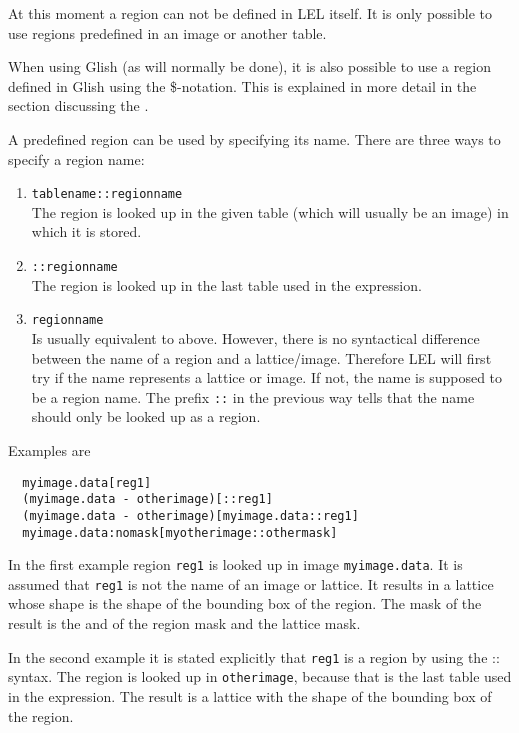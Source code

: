 \medskip\noindent At this moment a region can not be defined in LEL itself. It is
only possible to use regions predefined in an image or another table.

\medskip\noindent When using Glish (as will normally be done), it is also possible to use
a region defined in Glish using the \$-notation.  This is explained in
more detail in the section discussing the . 

\medskip\noindent A predefined region can be used by specifying its name.
There are three ways to specify a region name:

\begin{enumerate}
\item \texttt{tablename::regionname}  
\\The region is looked up in the given table (which will
usually be an image) in which it is stored.

\item \texttt{::regionname}
\\The region is looked up in the last table used in the expression.

\item \texttt{regionname}
\\Is usually equivalent to above. However, there is no syntactical
difference between the name of a region and a lattice/image.
Therefore LEL will first try if the name represents a lattice or
image. If not, the name is supposed to be a region name.
The prefix \texttt{::} in the previous way tells that the name
should only be looked up as a region.

\end{enumerate}

Examples are

\begin{verbatim}
  myimage.data[reg1]
  (myimage.data - otherimage)[::reg1]
  (myimage.data - otherimage)[myimage.data::reg1]
  myimage.data:nomask[myotherimage::othermask]
\end{verbatim}
In the first example region \texttt{reg1} is looked up in image
\texttt{myimage.data}. It is assumed that \texttt{reg1} is not the
name of an image or lattice.  It results in a lattice whose
shape is the shape of the bounding box of the region.  The
mask of the result is the and of the region mask and the lattice
mask.

\medskip\noindent In the second example it is stated explicitly that \texttt{reg1} is a
region by using the :: syntax.  The region is looked up in
\texttt{otherimage}, because that is the last table used in the
expression. The result is a lattice with the shape of the bounding box 
of the region.


